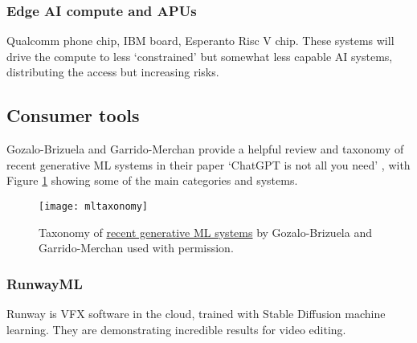 \subsubsection{Edge AI compute and APUs}
Qualcomm phone chip, IBM board, Esperanto Risc V chip. These systems will drive the compute to less `constrained' but somewhat less capable AI systems, distributing the access but increasing risks.
\subsection{Consumer tools}
Gozalo-Brizuela and Garrido-Merchan provide a helpful review and taxonomy of recent generative ML systems in their paper `ChatGPT is not all you need' \cite{gozalo2023chatgpt}, with Figure \ref{fig:MLtaxonomy} showing some of the main categories and systems. 

\begin{figure}
  \centering
    \texttt{[image: mltaxonomy]}
  \caption{Taxonomy of \href{https://arxiv.org/abs/2301.04655}{recent generative ML systems} by Gozalo-Brizuela and Garrido-Merchan used with permission.}
  \label{fig:MLtaxonomy}
\end{figure}

\begin{comment}
-Text-to-Image
DALL-E2
Stable diffusion
Muse
Imagen
-Text-to-3D
dreamfusion
magic3d
-image-to-text
Flamingo
VisualGPT
-Text-to-video
Phenaki
Soundify
-Text-to-code
Codex
Alphacode
-Text-to-Audio
AudioLM
Whisper
Jukebox
-Text-To-Text
ChatGPT3
PEER
LaMDA
Speech From Brain
-Text-to-science
Galactica
Minerva
-Other models
Alphatensor
GATO
Human motion diffusion model
\end{comment}

\subsubsection{RunwayML}
Runway is VFX software in the cloud, trained with Stable Diffusion machine learning. They are demonstrating incredible results for video editing.
